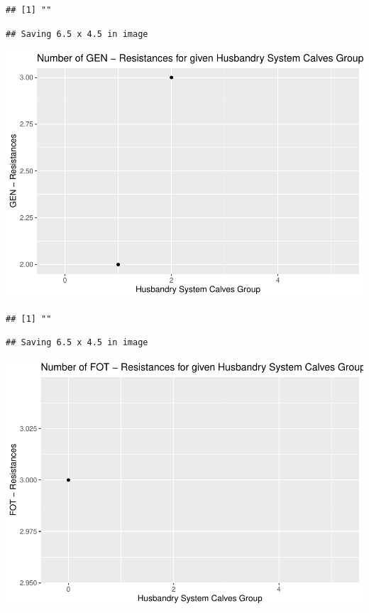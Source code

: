 \documentclass[
]{article}
\begin{document}
\begin{verbatim}
## [1] ""
\end{verbatim}

\begin{verbatim}
## Saving 6.5 x 4.5 in image
\end{verbatim}

\includegraphics{NResistenzen_files/figure-latex/binary_or_nominal_variables-34.pdf}

\begin{verbatim}
## [1] ""
\end{verbatim}

\begin{verbatim}
## Saving 6.5 x 4.5 in image
\end{verbatim}

\includegraphics{NResistenzen_files/figure-latex/binary_or_nominal_variables-35.pdf}
\end{document}

